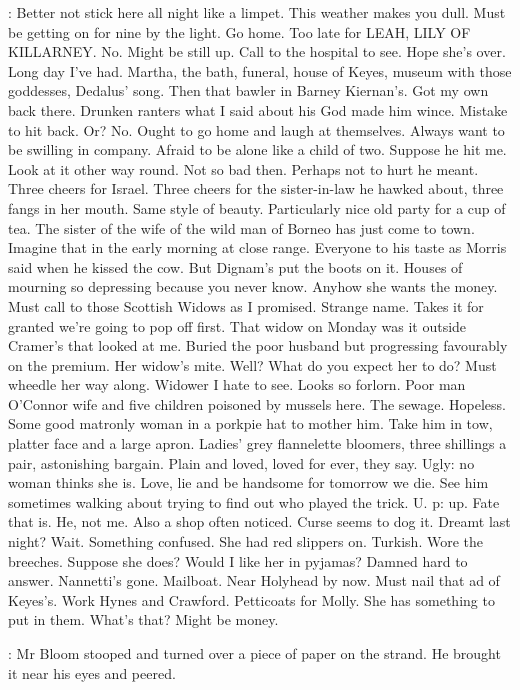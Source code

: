 \Bloom:
Better not stick here all night like a limpet. This weather makes you
dull. Must be getting on for nine by the light. Go home. Too late for LEAH,
LILY OF KILLARNEY. No. Might be still up. Call to the hospital to see.
Hope she's over. Long day I've had. Martha, the bath, funeral, house of
Keyes, museum with those goddesses, Dedalus' song. Then that bawler in
Barney Kiernan's. Got my own back there. Drunken ranters what I said about
his God made him wince. Mistake to hit back. Or? No. Ought to go home and
laugh at themselves. Always want to be swilling in company. Afraid to be
alone like a child of two. Suppose he hit me. Look at it other way round.
Not so bad then. Perhaps not to hurt he meant. Three cheers for Israel.
Three cheers for the sister-in-law he hawked about, three fangs in her
mouth. Same style of beauty. Particularly nice old party for a cup of tea.
The sister of the wife of the wild man of Borneo has just come to town.
Imagine that in the early morning at close range. Everyone to his taste as
Morris said when he kissed the cow. But Dignam's put the boots on it.
Houses of mourning so depressing because you never know. Anyhow she
wants the money. Must call to those Scottish Widows as I promised. Strange
name. Takes it for granted we're going to pop off first. That widow
on Monday was it outside Cramer's that looked at me. Buried the poor
husband but progressing favourably on the premium. Her widow's mite.
Well? What do you expect her to do? Must wheedle her way along.
Widower I hate to see. Looks so forlorn. Poor man O'Connor wife and five
children poisoned by mussels here. The sewage. Hopeless. Some good
matronly woman in a porkpie hat to mother him. Take him in tow, platter
face and a large apron. Ladies' grey flannelette bloomers, three shillings
a pair, astonishing bargain. Plain and loved, loved for ever, they say.
Ugly: no woman thinks she is. Love, lie and be handsome for tomorrow we
die. See him sometimes walking about trying to find out who played the
trick. U. p: up. Fate that is. He, not me. Also a shop often noticed.
Curse seems to dog it. Dreamt last night? Wait. Something confused. She
had red slippers on. Turkish. Wore the breeches. Suppose she does? Would
I like her in pyjamas? Damned hard to answer. Nannetti's gone. Mailboat.
Near Holyhead by now. Must nail that ad of Keyes's. Work Hynes and
Crawford. Petticoats for Molly. She has something to put in them. What's
that? Might be money.

:
Mr Bloom stooped and turned over a piece of paper on the strand. He
brought it near his eyes and peered.

